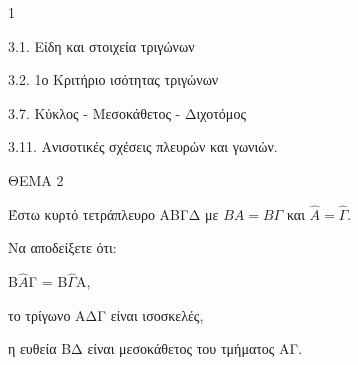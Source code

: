 \begin{ylh}{1}
    \item 3.1. Είδη και στοιχεία τριγώνων
    \item 3.2. 1ο Κριτήριο ισότητας τριγώνων
    \item 3.7. Κύκλος - Μεσοκάθετος - Διχοτόμος
    \item 3.11. Ανισοτικές σχέσεις πλευρών και γωνιών.
\end{ylh}

ΘΕΜΑ 2

Έστω κυρτό τετράπλευρο ΑΒΓΔ με $ΒΑ = Β\Gamma$ και $\widehat{Α} = \widehat{\Gamma}$.

Να αποδείξετε ότι:

\begin{alist}
\item B$\widehat{Α}$Γ = B$\widehat{\Gamma}$Α, 

\item το τρίγωνο ΑΔΓ είναι ισοσκελές, 

\item η ευθεία ΒΔ είναι μεσοκάθετος του τμήματος ΑΓ. 


\begin{center}
\end{center}
\end{alist}
